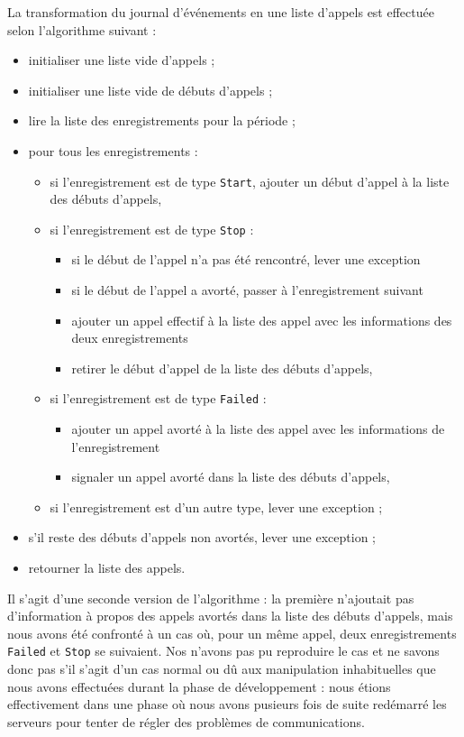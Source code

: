 La transformation du journal d’événements en une liste d’appels est effectuée selon l’algorithme suivant :
\begin{itemize}
	\item initialiser une liste vide d’appels ;
	\item initialiser une liste vide de débuts d’appels ;
	\item lire la liste des enregistrements pour la période ;
	\item pour tous les enregistrements :
		\begin{itemize}
			\item si l’enregistrement est de type \texttt{Start}, ajouter un début d’appel à la liste des débuts d’appels,
			\item si l’enregistrement est de type \texttt{Stop} :
				\begin{itemize}
					\item si le début de l’appel n’a pas été rencontré, lever une exception
					\item si le début de l’appel a avorté, passer à l’enregistrement suivant
					\item ajouter un appel effectif à la liste des appel avec les informations des deux enregistrements
					\item retirer le début d’appel de la liste des débuts d’appels,
				\end{itemize}
			\item si l’enregistrement est de type \texttt{Failed} :
				\begin{itemize}
					\item ajouter un appel avorté à la liste des appel avec les informations de l’enregistrement
					\item signaler un appel avorté dans la liste des débuts d’appels,
				\end{itemize}
			\item si l’enregistrement est d’un autre type, lever une exception ;
		\end{itemize}
	\item s’il reste des débuts d’appels non avortés, lever une exception ;
	\item retourner la liste des appels.
\end{itemize}

Il s’agit d’une seconde version de l’algorithme : la première n’ajoutait pas d’information à propos des appels avortés dans la liste des débuts d’appels, mais nous avons été confronté à un cas où, pour un même appel, deux enregistrements \texttt{Failed} et \texttt{Stop} se suivaient. Nos n’avons pas pu reproduire le cas et ne savons donc pas s’il s’agit d’un cas normal ou dû aux manipulation inhabituelles que nous avons effectuées durant la phase de développement : nous étions effectivement dans une phase où nous avons pusieurs fois de suite redémarré les serveurs pour tenter de régler des problèmes de communications.
